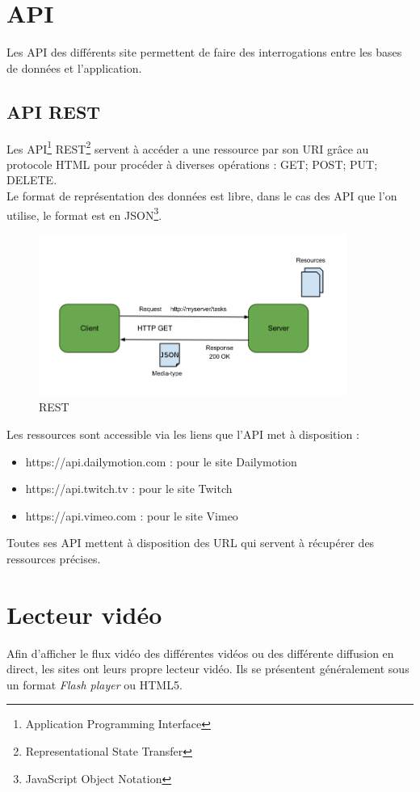 \documentclass[11pt]{report} %
\begin{document}
		
		
	\section{API}
	Les API des différents site permettent de faire des interrogations entre les bases de données et l'application.
		\subsection{API REST}
		Les API\footnote{Application Programming Interface} REST\footnote{Representational State Transfer} servent à accéder a une ressource par son URI grâce au protocole HTML pour procéder à diverses opérations : GET; POST; PUT; DELETE. \\		
		Le format de représentation des données est libre, dans le cas des API que l'on utilise, le format est en JSON\footnote{JavaScript Object Notation}.
		
		\begin{figure}[h]
			\center
			\includegraphics[width=0.9\textwidth]{../img/rest.png}
			\caption{REST}
			\label{rest}
		\end{figure}
		
		\noindent
		Les ressources sont accessible via les liens que l'API met à disposition :

		\begin{itemize}
		\item https://api.dailymotion.com : pour le site Dailymotion
		\item https://api.twitch.tv : pour le site Twitch
		\item https://api.vimeo.com : pour le site Vimeo
		\end{itemize}
		
		Toutes ses API mettent à disposition des URL qui servent à récupérer des ressources précises. 
		
		
	\section{Lecteur vidéo}
	Afin d'afficher le flux vidéo des différentes vidéos ou des différente diffusion en direct, les sites ont leurs propre lecteur vidéo.
	Ils se présentent généralement sous un format \textit{Flash player} ou HTML5.
	
\end{document}
